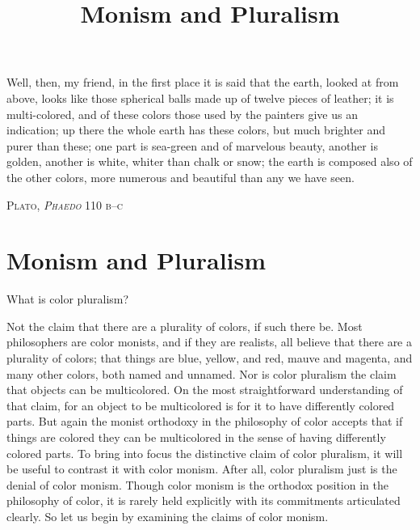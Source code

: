 \documentclass[12pt]{article}
\title{Monism and Pluralism}
\author{\myauthor}
\date{} %
\begin{document}
\maketitle
\epigraph{Well, then, my friend, in the first place it is said that the earth, looked at from above, looks like those spherical balls made up of twelve pieces of leather; it is multi-colored, and of these colors those used by the painters give us an indication; up there the whole earth has these colors, but much brighter and purer than these; one part is sea-green and of marvelous beauty, another is golden, another is white, whiter than chalk or snow; the earth is composed also of the other colors, more numerous and beautiful than any we have seen.}{\textsc{Plato, \emph{Phaedo} 110 b--c}} %

\setlength{\parindent}{1em}


\section{Monism and Pluralism} %
\label{sec:monism_and_pluralism}

What is color pluralism? 

Not the claim that there are a plurality of colors, if such there be. Most philosophers are color monists, and if they are realists, all believe that there are a plurality of colors; that things are blue, yellow, and red, mauve and magenta, and many other colors, both named and unnamed. Nor is color pluralism the claim that objects can be multicolored. On the most straightforward understanding of that claim, for an object to be multicolored is for it to have differently colored parts. But again the monist orthodoxy in the philosophy of color accepts that if things are colored they can be multicolored in the sense of having differently colored parts. To bring into focus the distinctive claim of color pluralism, it will be useful to contrast it with color monism. After all, color pluralism just is the denial of color monism. Though color monism is the orthodox position in the philosophy of color, it is rarely held explicitly with its commitments articulated clearly. So let us begin by examining the claims of color monism.
\end{document}
